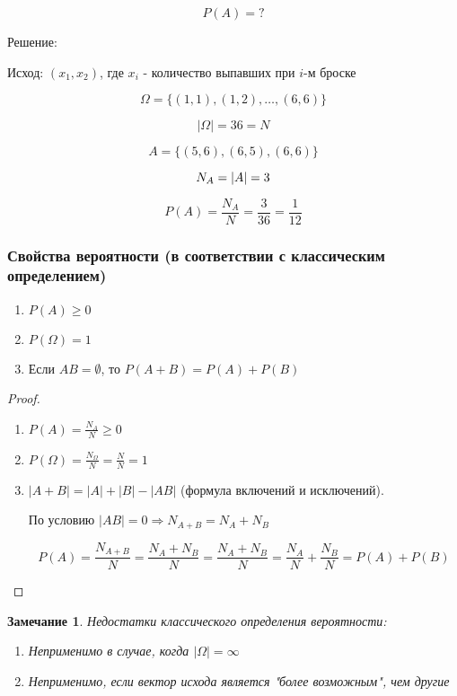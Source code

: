 \documentclass[a4paper, 14pt]{report}
\newtheorem{note}{Замечание}[section]
\begin{document}
$$
P(A) = ?
$$

Решение:

Исход: $(x_1, x_2)$, где $x_i$ - количество выпавших при $i$-м броске

$$
\Omega = \{ (1,1), (1,2), \dots, (6,6) \}
$$

$$
|\Omega| = 36 = N
$$

$$
A = \{ (5,6), (6,5), (6,6) \}
$$

$$
N_A = |A| = 3 \\
$$

$$
P(A) = \frac{N_A}{N} = \frac{3}{36} = \frac{1}{12}
$$

\subsubsection{Свойства вероятности (в соответствии с классическим определением)}

\begin{enumerate}
    \item $P(A) \geq 0$
    \item $P(\Omega) = 1$
    \item Если $AB = \emptyset$, то $P(A+B) = P(A) + P(B)$
\end{enumerate}

\begin{proof}
    \begin{enumerate}
        \item $P(A) = \frac{N_A}{N} \geq 0$
        \item $P(\Omega) = \frac{N_\Omega}{N} = \frac{N}{N} = 1$
        \item $|A+B|=|A|+|B|-|AB|$ (формула включений и исключений). 
            
            По условию $|AB|=0 \Rightarrow N_{A+B} = N_A + N_B$

            $$
            P(A) = \frac{N_{A+B}}{N} = \frac{N_A + N_B}{N} = \frac{N_A+N_B}{N}=\frac{N_A}{N} + \frac{N_B}{N} = P(A) + P(B)
            $$
    \end{enumerate}
\end{proof}

\begin{note}
    Недостатки классического определения вероятности:

    \begin{enumerate}
        \item Неприменимо в случае, когда $|\Omega| = \infty$
        \item Неприменимо, если вектор исхода является "более возможным", чем другие
    \end{enumerate}
\end{note}
\end{document}
